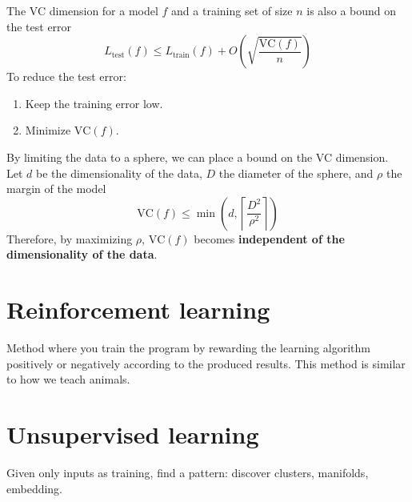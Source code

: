 \documentclass[11pt]{article}
\begin{document}
The VC dimension for a model \(f\) and a training set of size \(n\) is also a bound on the
test error
\[
  L_{\text{test}}(f) \leq L_{\text{train}}(f) + O\left(\sqrt{\frac{\text{VC}(f)}{n}}\right)
\]
To reduce the test error:
\begin{enumerate}
\item Keep the training error low.
\item Minimize \(\text{VC}(f)\).
\end{enumerate}
By limiting the data to a sphere, we can place a bound on the VC dimension. \\
Let \(d\) be the dimensionality of the data, \(D\) the diameter of the sphere, and
\(\rho\) the margin of the model
\[
  \text{VC}(f) \leq \min\left( d, \left\lceil \frac{D^2}{\rho^2} \right\rceil \right)
\]
Therefore, by maximizing \(\rho\), \(\text{VC}(f)\) becomes \textbf{independent of the dimensionality of
the data}.
\section{Reinforcement learning}
\label{sec:org5494818}
Method where you train the program by rewarding the learning algorithm positively or
negatively according to the produced results. This method is similar to how we teach
animals.
\section{Unsupervised learning}
\label{sec:org29260a2}
Given only inputs as training, find a pattern: discover clusters, manifolds, embedding.
\end{document}
